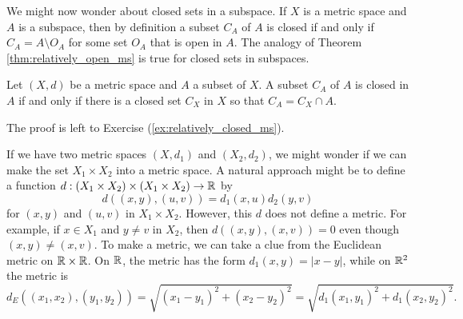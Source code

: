 \begin{comment}

\ActivitySolution

\ba
\item Since $O_A = O_X \cap A$, we also have $a \in O_X$. The fact that $O_X$ is open means that there exists $\delta > 0$ such that $B_X(a, \delta)$ is a subset of $O_X$. 

\item Let $B_A(a, \delta) = B_X(a, \delta) \cap A$. We will show that $B_A(a, \delta)$ is the open ball $B$ in $A$ centered at $a$ of radius $\delta$. If $t \in B_A(a, \delta)$, then $t \in A$ and $t \in B_X(a, \delta)$. So $t \in A$ and $d|_A(t,a) < \delta$. So $t \in B$. Now suppose $t \in B$. Then $t \in A$ and $d|_A(t,a) = d(t,a) < \delta$. Thus, $t \in A$ and $t \in B_X(a, \delta)$. This means that $t \in B_X(a, \delta) \cap A = _A(a, \delta)$. Thus, $B_A(a, \delta) = B$ and $B_A(a, \delta)$ is the open ball in $A$ centered at $a$ of radius $\delta$.

\item Since $B_A(a, \delta)$ is an open set in $A$, we conclude that $O_A$ is a neighborhood of each of its points and $O_A$ is open in $A$. 

\ea

\end{comment}

We might now wonder about closed sets in a subspace. If $X$ is a metric space and $A$ is a subspace, then by definition a subset $C_A$ of $A$ is closed if and only if $C_A = A \setminus O_A$ for some set $O_A$ that is open in $A$. The  analogy of Theorem \ref{thm:relatively_open_ms} is true for closed sets in subspaces.

\begin{theorem} \label{thm:relatively_closed_ms} Let $(X,d)$ be a metric space and $A$ a subset of $X$. A subset $C_A$ of $A$ is closed in $A$ if and only if there is a closed set $C_X$ in $X$ so that $C_A = C_X \cap A$. 
\end{theorem}

The proof is left to Exercise (\ref{ex:relatively_closed_ms}).


\label{sec_prod_metric}
If we have two metric spaces $(X, d_1)$ and $(X_2 ,d_2)$, we might wonder if we can make the set $X_1 \times X_2$ into a metric space. A natural approach might be to define a function $d : (X_1 \times X_2) \times (X_1 \times X_2) \to \mathbb{R}$ by 
\[d((x,y),(u,v)) = d_1(x,u)d_2(y,v)\]
for $(x,y)$ and $(u,v)$ in $X_1 \times X_2$. However, this $d$ does not define a metric. For example, if $x \in X_1$ and $y \neq v$ in $X_2$, then $d((x,y),(x,v)) = 0$ even though $(x,y) \neq (x,v)$. To make a metric, we can take a clue from the Euclidean metric on $\mathbb{R} \times \mathbb{R}$. On $\mathbb{R}$, the metric has the form $d_1(x,y) = |x-y|$, while on $\mathbb{R}^2$ the metric  is 
\[d_E((x_1,x_2), (y_1,y_2)) = \sqrt{ (x_1-y_1)^2 + (x_2-y_2)^2} = \sqrt{d_1(x_1,y_1)^2 + d_1(x_2,y_2)^2}.\]

